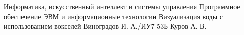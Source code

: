 \documentclass{bmstu}
\begin{document}
\renewcommand{\thelstlisting}{\arabic{lstlisting}}

\makecourseworktitle
    {Информатика, искусственный интеллект и системы управления}
    {Программное обеспечение ЭВМ и информационные технологии}
    {Визуализация воды с использованием вокселей}
    {Виноградов И. А./ИУ7-53Б} 
    {Куров А. В.} 
    {} 

\maketableofcontents








\makebibliography
\end{document}
